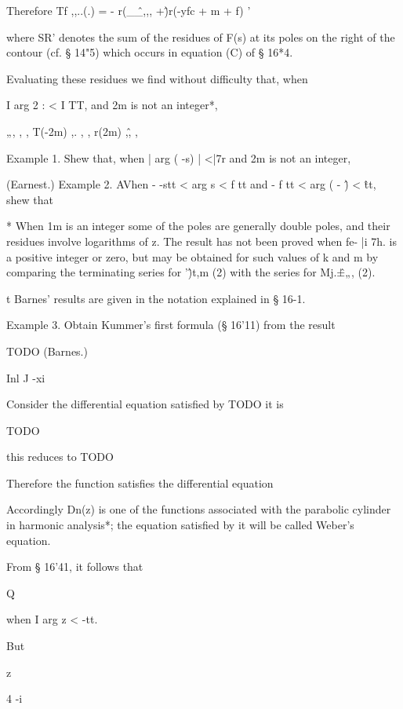 Therefore Tf ,,..(.) = - r(\_\^\_,,, +\^)r(-yfc + m + f) '

where SR' denotes the sum of the residues of F(s) at its poles on the
right of the contour (cf. § 14"5) which occurs in equation (C) of §
16*4.

Evaluating these residues we find without difficulty that, when

I arg 2 : < I TT, and 2m is not an integer*,

„, , , T(-2m) ,. , , r(2m) ,\^ , ,

Example 1. Shew that, when | arg ( -s) | <|7r and 2m is not an
integer,

(Earnest.) Example 2. AVhen - -stt < arg s < f tt and - f tt < arg ( -
\^) < \^tt, shew that

* When 1m is an integer some of the poles are generally double poles,
and their residues involve logarithms of z. The result has not been
proved when fe- |i 7h. is a positive integer or zero, but may be
obtained for such values of k and m by comparing the terminating
series for '\^)t,m (2) with the series for Mj.\^±„, (2).

t Barnes' results are given in the notation explained in § 16-1.


%
%

Example 3. Obtain Kummer's first formula (§ 16'11) from the result

TODO (Barnes.)

Inl J -xi


Consider the differential equation satisfied by TODO it is

TODO

this reduces to TODO

Therefore the function satisfies the differential equation

Accordingly Dn(z) is one of the functions associated with the
parabolic cylinder in harmonic analysis*; the equation satisfied by it
will be called Weber's equation.

From § 16'41, it follows that

Q

when I arg z < -tt.



But



z



4 -i






